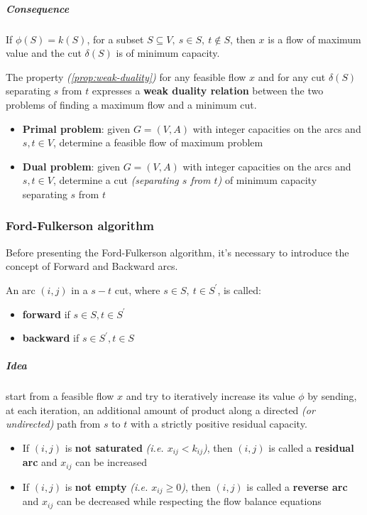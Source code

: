 \documentclass[english]{article}
\begin{document}
\subparagraph*{Consequence}
If \(\phi(S) = k(S)\), for a subset \(S \subseteq V, \ s \in S, \ t \notin S\), then \(x\) is a flow of maximum value and the cut \(\delta(S)\) is of minimum capacity.

The property \textit{(\ref{prop:weak-duality})} for any feasible flow \(x\) and for any cut \(\delta(S)\) separating \(s\) from \(t\) expresses a \textbf{weak duality relation} between the two problems of finding a maximum flow and a minimum cut.

\begin{itemize}
  \item \textbf{Primal problem}: given \(G = (V, A)\) with integer capacities on the arcs and \(s, t \in V\), determine a feasible flow of maximum problem
  \item \textbf{Dual problem}: given \(G = (V, A)\) with integer capacities on the arcs and \(s, t \in V\), determine a cut \textit{(separating \(s\) from \(t\))} of minimum capacity separating \(s\) from \(t\)
\end{itemize}

\subsubsection{Ford-Fulkerson algorithm}

Before presenting the Ford-Fulkerson algorithm, it's necessary to introduce the concept of Forward and Backward arcs.

\begin{property}
  \label{prop:forward-backward-arc}
  An arc \(\left( i, j \right)\) in a \(s-t\) cut, where \(s \in S,\ t \in S^\prime\), is called:
  \begin{itemize}
    \item \textbf{forward} if \(s \in S, t \in S^\prime\)
    \item \textbf{backward} if \(s \in S^\prime, t \in S\)
  \end{itemize}
\end{property}

\subparagraph*{Idea}
start from a feasible flow \(x\) and try to iteratively increase its value \(\phi\) by sending, at each iteration, an additional amount of product along a directed \textit{(or undirected)} path from \(s\) to \(t\) with a strictly positive residual capacity.

\begin{itemize}
  \item If \(\left( i, j \right)\) is \textbf{not saturated} \textit{(i.e. \(x_{ij} < k_{ij}\))}, then \(\left( i, j \right)\) is called a \textbf{residual arc} and \(x_{ij}\) can be increased
  \item If \(\left( i, j \right)\) is \textbf{not empty} \textit{(i.e. \(x_{ij} \geq 0\))}, then \(\left( i, j \right)\) is called a \textbf{reverse arc} and \(x_{ij}\) can be decreased while respecting the flow balance equations
\end{itemize}
\end{document}

